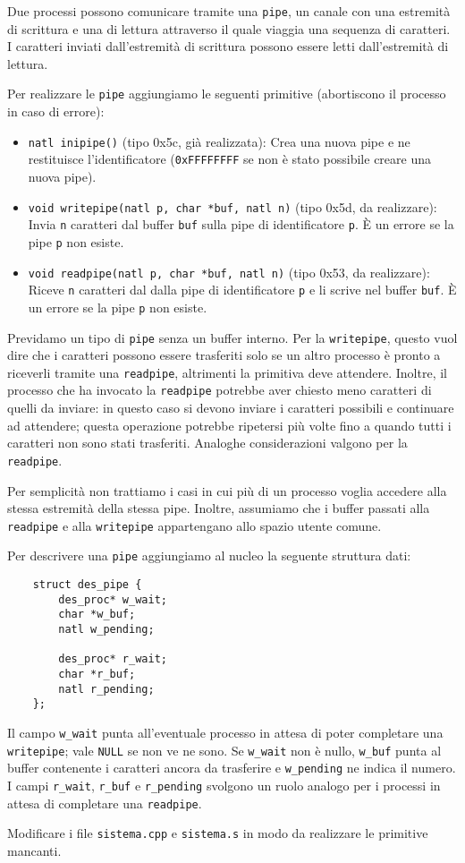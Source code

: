 Due processi possono comunicare tramite una \verb|pipe|, un canale con una estremit\`a di scrittura e una
di lettura attraverso il quale viaggia una sequenza di caratteri. I caratteri inviati dall'estremit\`a di
scrittura possono essere letti dall'estremit\`a di lettura.

Per realizzare le \verb|pipe| aggiungiamo le seguenti primitive (abortiscono il processo in caso di errore):
\begin{itemize}
   \item \verb|natl inipipe()| (tipo 0x5c, gi\`a realizzata):
   	Crea una nuova pipe e ne restituisce l'identificatore (\verb|0xFFFFFFFF| se non \`e stato
	possibile creare una nuova pipe).
   \item \verb|void writepipe(natl p, char *buf, natl n)| (tipo 0x5d, da realizzare):
   	Invia \verb|n| caratteri dal buffer \verb|buf| sulla pipe di identificatore \verb|p|.
	\`E un errore se la pipe \verb|p| non esiste.
   \item \verb|void readpipe(natl p, char *buf, natl n)| (tipo 0x53, da realizzare):
   	Riceve \verb|n| caratteri dal dalla pipe di identificatore \verb|p| e li scrive nel
	buffer \verb|buf|.  \`E un errore se la pipe \verb|p| non esiste.
\end{itemize}

Previdamo un tipo di \verb|pipe| senza un buffer interno. Per la \verb|writepipe|,
questo vuol dire che i caratteri possono essere trasferiti solo se un altro processo \`e pronto a riceverli
tramite una \verb|readpipe|, altrimenti la primitiva deve attendere. Inoltre, il processo che ha
invocato la \verb|readpipe| potrebbe aver chiesto meno caratteri di quelli da inviare: in questo caso
si devono inviare i caratteri possibili e continuare ad attendere; questa operazione potrebbe
ripetersi pi\`u volte fino a quando tutti i caratteri non sono stati trasferiti. Analoghe considerazioni
valgono per la \verb|readpipe|.

Per semplicit\`a non trattiamo i casi in cui pi\`u di un processo voglia accedere alla stessa estremit\`a
della stessa pipe. Inoltre, assumiamo che i buffer passati alla \verb|readpipe| e alla \verb|writepipe|
appartengano allo spazio utente comune.

Per descrivere una \verb|pipe| aggiungiamo al nucleo la seguente struttura dati:

\begin{verbatim}
    struct des_pipe {
        des_proc* w_wait;
        char *w_buf;
        natl w_pending;

        des_proc* r_wait;
        char *r_buf;
        natl r_pending;
    };
\end{verbatim}

Il campo \verb|w_wait| punta all'eventuale processo in attesa di poter completare una \verb|writepipe|; vale \verb|NULL|
se non ve ne sono. Se \verb|w_wait| non \`e nullo, \verb|w_buf| punta al buffer contenente i caratteri ancora da trasferire
e \verb|w_pending| ne indica il numero. I campi \verb|r_wait|, \verb|r_buf| e \verb|r_pending| svolgono un ruolo analogo
per i processi in attesa di completare una \verb|readpipe|.

Modificare i file \verb|sistema.cpp| e \verb|sistema.s| in modo da realizzare le primitive mancanti.
